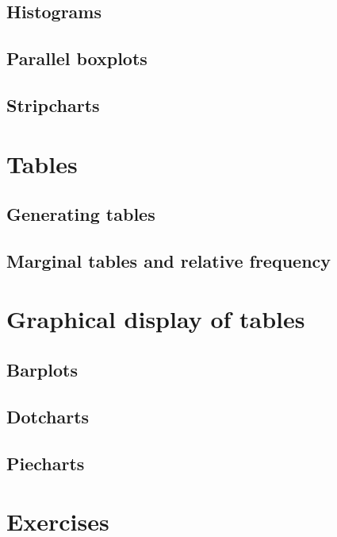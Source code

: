 \subsection{Histograms}
\subsection{Parallel boxplots}
\subsection{Stripcharts}
\section{Tables} \label{tables}
\subsection{Generating tables}
\subsection{Marginal tables and relative frequency}
\section{Graphical display of tables}
\subsection{Barplots}
\subsection{Dotcharts}
\subsection{Piecharts}
\section{Exercises}

